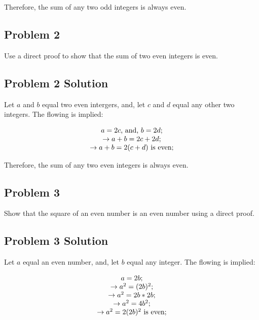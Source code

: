 \documentclass[11pt]{article}
\begin{document}
Therefore, the sum of any two odd integers is always even.

\subsection{Problem 2}

Use a direct proof to show that the sum of two even integers is even.

\subsection {Problem 2 Solution}

Let $a$ and $b$ equal two even intergers, and, let $c$ and $d$ equal any other two integers. The flowing is implied:

\begin{displaymath}
\begin{tabular}{c}
$a = 2c$, and, $b = 2d;$ \\
$\to a + b = 2c + 2d;$ \\
$\to a + b = 2(c + d)$ is even; \\
\end{tabular}
\end{displaymath}

Therefore, the sum of any two even integers is always even.

\subsection{Problem 3}

Show that the square of an even number is an even number using a direct proof.

\subsection{Problem 3 Solution}

Let $a$ equal an even number, and, let $b$ equal any integer. The flowing is implied:

\begin{displaymath}
\begin{tabular}{c}
$a = 2b;$ \\
$\to a^2 = (2b)^2;$ \\
$\to a^2 = 2b * 2b;$ \\
$\to a^2 = 4b^2;$ \\
$\to a^2 = 2(2b)^2$ is even; \\
\end{tabular}
\end{displaymath}
\end{document}
